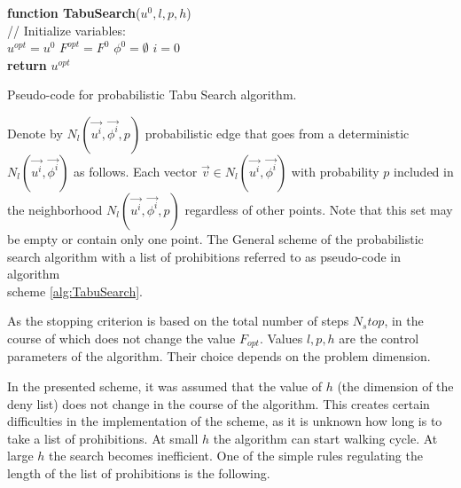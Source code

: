 \documentclass[]{TAACpaper}
\begin{document}
\begin{algorithm}[H]
	\textbf{function TabuSearch}($u^0,l,p,h$) \\
	// Initialize variables:	\\
	$u^{opt} = u^0$
	$F^{opt} = F^0$
	$\phi^{0} =  \emptyset$
	$i=0$ \\
	\textbf{return} $u^{opt}$
	
\caption{Pseudo-code for probabilistic Tabu Search algorithm.}
\label{alg:TabuSearch}
\end{algorithm}

Denote by $N_l(\vec{u^i},\vec{\phi^i},p)$ probabilistic edge that goes from a deterministic $N_l(\vec{u^i},\vec{\phi^i})$ as follows. Each vector $\vec{v} \in N_l(\vec{u^i},\vec{\phi^i})$ with probability $p$ included in the neighborhood $N_l(\vec{u^i},\vec{\phi^i},p)$ regardless of other points. Note that this set may be empty or contain only one point. The General scheme of the probabilistic search algorithm with a list of prohibitions referred to as pseudo-code in algorithm \\
scheme \ref{alg:TabuSearch}.

As the stopping criterion is based on the total number of steps $N_stop$, in the course of which does not change the value $F_{opt}$. Values $l,p,h$ are the control parameters of the algorithm. Their choice depends on the problem dimension.

In the presented scheme, it was assumed that the value of $h$ (the dimension of the deny list) does not change in the course of the algorithm. This creates certain difficulties in the implementation of the scheme, as it is unknown how long is to take a list of prohibitions. At small $h$ the algorithm can start walking cycle. At large $h$ the search becomes inefficient. One of the simple rules regulating the length of the list of prohibitions is the following.
\end{document}
